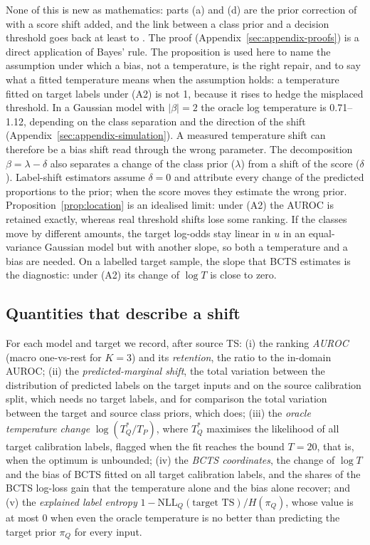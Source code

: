 None of this is new as mathematics: parts (a) and (d) are the prior correction of \citet{saerens2002adjusting} with
a score shift added, and the link between a class prior and a decision threshold goes back at least to
\citet{elkan2001foundations}. The proof (Appendix~\ref{sec:appendix-proofs}) is a direct application of Bayes' rule.
The proposition is used here to name the assumption under which a bias, not a temperature, is the right repair, and to say what a fitted temperature means
when the assumption holds: a temperature fitted on target labels under (A2) is not 1, because it rises to hedge the
misplaced threshold. In a Gaussian model with $|\beta| = 2$ the oracle log temperature is 0.71--1.12, depending on
the class separation and the direction of the shift (Appendix~\ref{sec:appendix-simulation}). A measured
temperature shift can therefore be a bias shift read through the wrong parameter. The decomposition $\beta = \lambda - \delta$ also separates a change of the class
prior ($\lambda$) from a shift of the score ($\delta$). Label-shift estimators assume $\delta = 0$ and attribute every
change of the predicted proportions to the prior; when the score moves they estimate the wrong prior. Proposition~\ref{prop:location} is
an idealised limit: under (A2) the AUROC is retained exactly, whereas real threshold shifts lose some ranking. If the
classes move by different amounts, the target log-odds stay linear in $u$ in an equal-variance Gaussian model but with
another slope, so both a temperature and a bias are needed. On a labelled target sample, the slope that BCTS estimates
is the diagnostic: under (A2) its change of $\log T$ is close to zero.

\subsection{Quantities that describe a shift}
\label{sec:background-coordinates}

For each model and target we record, after source TS:
(i) the ranking \emph{AUROC} (macro one-vs-rest for $K = 3$) and its \emph{retention}, the ratio to the in-domain AUROC;
(ii) the \emph{predicted-marginal shift}, the total variation between the distribution of predicted labels on the
target inputs and on the source calibration split, which needs no target labels, and for comparison the total
variation between the target and source class priors, which does;
(iii) the \emph{oracle temperature change} $\log(T^{*}_{Q}/T_{P})$, where $T^{*}_{Q}$ maximises the likelihood of all
target calibration labels, flagged when the fit reaches the bound $T = 20$, that is, when the optimum is unbounded;
(iv) the \emph{BCTS coordinates}, the change of $\log T$ and the bias of BCTS fitted on all target calibration labels,
and the shares of the BCTS log-loss gain that the temperature alone and the bias alone recover; and
(v) the \emph{explained label entropy} $1 - \mathrm{NLL}_{Q}(\text{target TS}) / H(\pi_Q)$, whose value is at most 0
when even the oracle temperature is no better than predicting the target prior $\pi_Q$ for every input.

